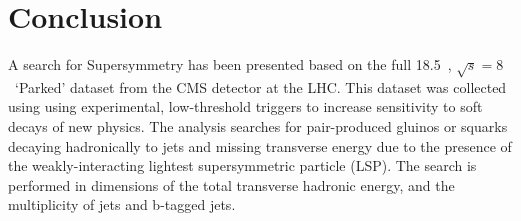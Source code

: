 \chapter{Conclusion}
\label{ch:conclusion}

\ifpdf
    \graphicspath{{Chapter10/Figs/Raster/}{Chapter10/Figs/PDF/}{Chapter10/Figs/}}
\else
    \graphicspath{{Chapter10/Figs/Vector/}{Chapter10/Figs/}}
\fi
















A search for Supersymmetry has been presented based on the full 18.5~\fb, 
$\sqrt{s} = 8$~\tev `Parked' dataset from the CMS detector at the LHC.
This dataset was collected using
using experimental, low-threshold triggers to increase sensitivity to soft
decays of new physics. The
analysis searches for pair-produced gluinos or squarks decaying hadronically to
jets and missing transverse energy due to the presence of the weakly-interacting
lightest supersymmetric particle (LSP). The search is performed in dimensions of
the total transverse hadronic energy, and the multiplicity of jets and b-tagged
jets.


